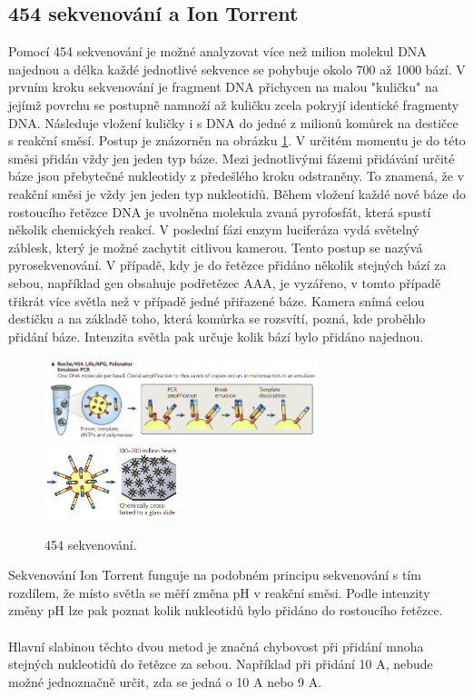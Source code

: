 \documentclass[czech,DP]{thesiskiv}
\numberwithin{equation}{section}
\begin{document}
\subsection{454 sekvenování a Ion Torrent}
Pomocí 454 sekvenování je možné analyzovat více než milion molekul DNA najednou a délka každé jednotlivé sekvence se pohybuje okolo 700 až 1000 bází. V prvním kroku sekvenování je fragment DNA přichycen na malou "kuličku" \space na jejímž povrchu se postupně namnoží až kuličku zcela pokryjí identické fragmenty DNA. Následuje vložení kuličky i s DNA do jedné z milionů komůrek na destičce s reakční směsí. Postup je znázorněn na obrázku \ref{fig:sekvenovani_454}. V určitém momentu je do této směsi přidán vždy jen jeden typ báze. Mezi jednotlivými fázemi přidávání určité báze jsou přebytečné nukleotidy z předešlého kroku odstraněny. To znamená, že v reakční směsi je vždy jen jeden typ nukleotidů. Během vložení každé nové báze do rostoucího řetězce DNA je uvolněna molekula zvaná pyrofosfát, která spustí několik chemických reakcí. V poslední fázi enzym luciferáza vydá světelný záblesk, který je možné zachytit citlivou kamerou. Tento postup se nazývá pyrosekvenování. V případě, kdy je do řetězce přidáno několik stejných bází za sebou, například gen obsahuje podřetězec AAA, je vyzářeno, v tomto případě třikrát více světla než v případě jedné přiřazené báze. Kamera snímá celou destičku a na základě toho, která komůrka se rozsvítí, pozná, kde proběhlo přidání báze. Intenzita světla pak určuje kolik bází bylo přidáno najednou. 


\begin{figure}[H]		
		\centering
		\includegraphics[width=300px]{./img/sekvenace_454_1.png}
		\includegraphics[width=150px]{./img/sekvenace_454_2.png}
		\caption{454 sekvenování. \cite{ngs_merzker}}
		\label{fig:sekvenovani_454}
\end{figure}

\noindent
Sekvenování Ion Torrent funguje na podobném principu sekvenování s tím rozdílem, že místo světla se měří změna pH v reakční směsi. Podle intenzity změny pH lze pak poznat kolik nukleotidů bylo přidáno do rostoucího řetězce.
\\
\\
Hlavní slabinou těchto dvou metod je značná chybovost při přidání mnoha stejných nukleotidů do řetězce za sebou. Například při přidání 10 A, nebude možné jednoznačně určit, zda se jedná o 10 A nebo 9 A.
\end{document}

